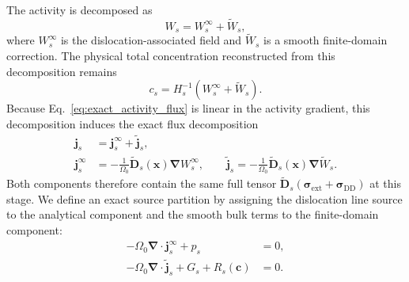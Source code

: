 \documentclass[10pt]{article}
\begin{document}
The activity is decomposed as
\begin{equation}
    W_s=W_s^\infty+\widetilde W_s,
    \label{eq:theory_activity_split}
\end{equation}
where $W_s^\infty$ is the dislocation-associated field and
$\widetilde W_s$ is a smooth finite-domain correction.  The physical total
concentration reconstructed from this decomposition remains
\begin{equation}
    c_s
    =
    H_s^{-1}
    \left(W_s^\infty+\widetilde W_s\right).
    \label{eq:theory_total_concentration}
\end{equation}
Because Eq.~\eqref{eq:exact_activity_flux} is linear in the activity gradient,
this decomposition induces the exact flux decomposition
\begin{align}
    \bm j_s
    &=
    \bm j_s^\infty+\widetilde{\bm j}_s,
    \label{eq:exact_flux_split}
    \\
    \bm j_s^\infty
    &=
    -\frac{1}{\Omega_0}
    \widetilde{\bm D}_s(\bm x)\bm\nabla W_s^\infty,
    \qquad
    \widetilde{\bm j}_s
    =
    -\frac{1}{\Omega_0}
    \widetilde{\bm D}_s(\bm x)\bm\nabla\widetilde W_s.
    \label{eq:exact_component_fluxes}
\end{align}
Both components therefore contain the same full tensor
$\widetilde{\bm D}_s(\bm\sigma_{\mathrm{ext}}+
\bm\sigma_{\mathrm{DD}})$ at this stage.  We define an exact source partition
by assigning the dislocation line source to the analytical component and the
smooth bulk terms to the finite-domain component:
\begin{align}
    -\Omega_0\bm\nabla\cdot\bm j_s^\infty+p_s&=0,
    \label{eq:exact_analytical_balance}
    \\
    -\Omega_0\bm\nabla\cdot\widetilde{\bm j}_s
    +G_s+R_s(\bm c)&=0.
    \label{eq:exact_smooth_balance}
\end{align}
\end{document}
